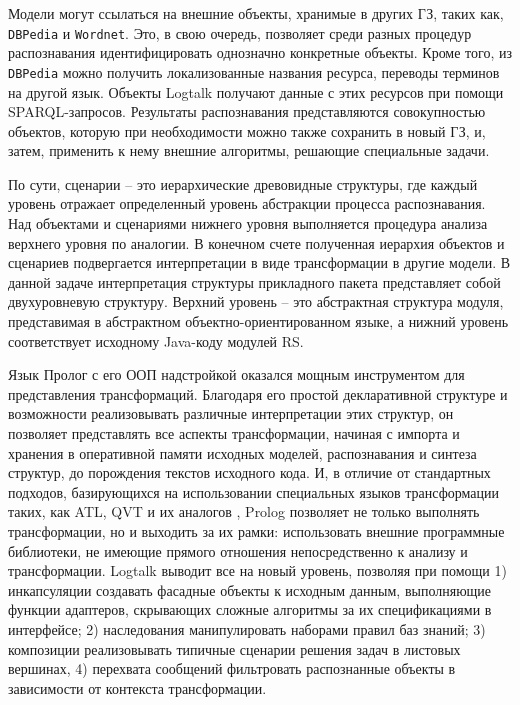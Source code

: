 \documentclass[12pt]{article}
\begin{document}
Модели могут ссылаться на внешние объекты, хранимые в других ГЗ, таких как, \texttt{DBPedia} и \texttt{Wordnet}.  Это, в свою очередь, позволяет среди разных процедур распознавания идентифицировать однозначно конкретные объекты.  Кроме того, из \texttt{DBPedia} можно получить локализованные названия ресурса, переводы терминов на другой язык.  Объекты Logtalk получают данные с этих ресурсов при помощи SPARQL-запросов.  Результаты распознавания представляются совокупностью объектов, которую при необходимости можно также сохранить в новый ГЗ, и, затем, применить к нему внешние алгоритмы, решающие специальные задачи.

По сути, сценарии -- это иерархические древовидные структуры, где каждый уровень отражает определенный уровень абстракции процесса распознавания.  Над объектами и сценариями нижнего уровня выполняется процедура анализа верхнего уровня по аналогии.  В конечном счете полученная иерархия объектов и сценариев подвергается интерпретации в виде трансформации в другие модели.  В данной задаче интерпретация структуры прикладного пакета представляет собой двухуровневую структуру. Верхний уровень -- это абстрактная структура модуля, представимая в абстрактном объектно-ориентированном языке, а нижний уровень соответствует исходному Java-коду модулей RS.

Язык Пролог с его ООП надстройкой оказался мощным инструментом для представления трансформаций.  Благодаря его простой декларативной структуре и возможности реализовывать различные интерпретации этих структур, он позволяет представлять все аспекты трансформации, начиная с импорта и хранения в оперативной памяти исходных моделей, распознавания и синтеза структур, до порождения текстов исходного кода.  И, в отличие от стандартных подходов, базирующихся на использовании специальных языков трансформации таких, как ATL, QVT и их аналогов \cite{azis,QVT,nikita}, Prolog позволяет не только выполнять трансформации, но и выходить за их рамки: использовать внешние программные библиотеки, не имеющие прямого отношения непосредственно к анализу и трансформации.  Logtalk выводит все на новый уровень, позволяя при помощи 1) инкапсуляции создавать фасадные объекты к исходным данным, выполняющие функции адаптеров, скрывающих сложные алгоритмы за их спецификациями в интерфейсе; 2) наследования манипулировать наборами правил баз знаний; 3) композиции реализовывать типичные сценарии решения задач в листовых вершинах, 4) перехвата сообщений фильтровать распознанные объекты в зависимости от контекста трансформации.
\end{document}
